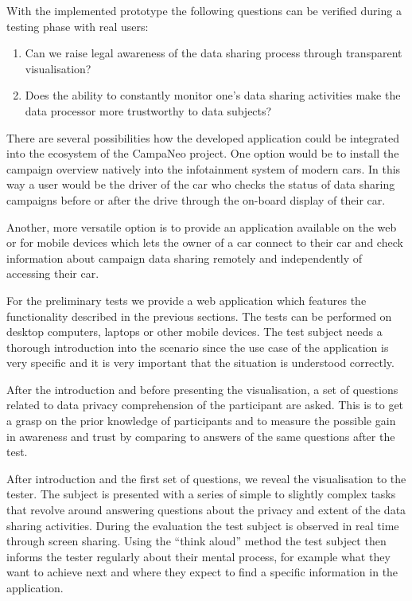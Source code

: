 \documentclass[../paper.tex]{subfiles}
\begin{document}
  With the implemented prototype the following questions can be verified during a
  testing phase with real users:
  \begin{enumerate}
    \item Can we raise legal awareness of the data sharing process through
          transparent visualisation?
    \item Does the ability to constantly monitor one’s data sharing activities
          make the data processor more trustworthy to data subjects?
  \end{enumerate}
  There are several possibilities how the developed application could be
  integrated into the ecosystem of the CampaNeo project.
  One option would be to install the campaign overview natively into the
  infotainment system of modern cars. In this way a user would be the driver
  of the car who checks the status of data sharing campaigns before or after
  the drive through the on-board display of their car.

  Another, more versatile option is to provide an application available
  on the web or for mobile devices which lets the owner of a car connect to
  their car and check information about campaign data sharing remotely and
  independently of accessing their car.

  For the preliminary tests we provide a web application which features the functionality described in the
  previous sections. The tests can be performed on desktop computers, laptops
  or other mobile devices. The test subject needs a thorough introduction
  into the scenario since the use case of the application is very specific and
  it is very important that the situation is understood correctly.

  After the introduction and before presenting the visualisation, a set of questions related to data privacy comprehension of the participant are asked. This is to get a grasp on the prior knowledge of participants and to measure the possible gain in awareness and trust by comparing to answers of the same questions after the test.

  After introduction and the first set of questions, we reveal the visualisation to the tester. The subject is presented with
  a series of simple to slightly complex tasks that revolve around answering
  questions about the privacy and extent of the data sharing activities.
  During the evaluation the test subject is observed in real time
  through screen sharing. Using the “think aloud” method the test subject then
  informs the tester regularly about their mental process, for example what
  they want to achieve next and where they expect to find a specific information
  in the application.
\end{document}
